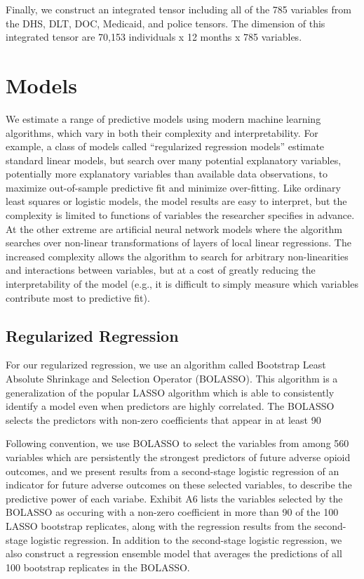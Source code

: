 \documentclass[10pt, letter]{article}
\begin{document}
Finally, we construct an integrated tensor including all of the 785 variables from the DHS, DLT, DOC, Medicaid, and police tensors. The dimension of this integrated tensor are 70,153 individuals x 12 months x 785 variables.

\section{Models}

We estimate a range of predictive models using modern machine learning algorithms, which vary in both their complexity and interpretability. For example, a class of models called ``regularized regression models'' estimate standard linear models, but search over many potential explanatory variables, potentially more explanatory variables than available data observations, to maximize out-of-sample predictive fit and minimize over-fitting. Like ordinary least squares or logistic models, the model results are easy to interpret, but the complexity is limited to functions of variables the researcher specifies in advance. At the other extreme are artificial neural network models where the algorithm searches over non-linear transformations of layers of local linear regressions. The increased complexity allows the algorithm to search for arbitrary non-linearities and interactions between variables, but at a cost of greatly reducing the interpretability of the model (e.g., it is difficult to simply measure which variables contribute most to predictive fit).

\subsection{Regularized Regression}

For our regularized regression, we use an algorithm called Bootstrap Least Absolute Shrinkage and Selection Operator (BOLASSO). This algorithm is a generalization of the popular LASSO algorithm which is able to consistently identify a model even when predictors are highly correlated. The BOLASSO selects the predictors with non-zero coefficients that appear in at least 90%

Following convention, we use BOLASSO to select the variables from among 560 variables which are persistently the strongest predictors of future adverse opioid outcomes, and we present results from a second-stage logistic regression of an indicator for future adverse outcomes on these selected variables, to describe the predictive power of each variabe. Exhibit A6 lists the variables selected by the BOLASSO as occuring with a non-zero coefficient in more than 90 of the 100 LASSO bootstrap replicates, along with the regression results from the second-stage logistic regression. In addition to the second-stage logistic regression, we also construct a regression ensemble model that averages the predictions of all 100 bootstrap replicates in the BOLASSO.
\end{document}
